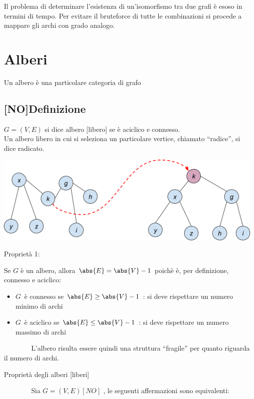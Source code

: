\documentclass{article}
\providecommand{\tightlist}{%
  \setlength{\itemsep}{0pt}\setlength{\parskip}{0pt}}
\begin{document}
{{{{}

{Il problema di determinare l'esistenza di un'isomorfismo tra due grafi è esoso in termini di tempo. Per evitare il bruteforce di tutte le combinazioni si procede a mappare gli archi con grado analogo.}

\hypertarget{h.jnoiha3cadu8}{\section{\texorpdfstring{{Alberi}}{Alberi}}\label{h.jnoiha3cadu8}}

{Un albero è una particolare categoria di grafo}

\subsection{{[}NO{]}Definizione}

$G=(V,E)$ si dice albero {[}libero{]} se è aciclico e connesso.\\
Un albero libero in cui si seleziona un particolare vertice, chiamato ``radice'', si dice radicato.

{\includegraphics{images/image533.png}}

{Proprietà 1:}

Se $G$ è un albero, allora $\abs{E} = \abs{V} - 1$ poichè è, per definizione, connesso e aciclico:

\begin{itemize}
\tightlist
\item
  $G${~è connesso se $\abs{E} \geq \abs{V} - 1$ : si deve rispettare un numero minimo di archi}
\item
  $G${~è aciclico se $\abs{E} \leq \abs{V} - 1$ : si deve rispettare un numero massimo di archi}
\end{itemize}

{~~~~~~~~L'albero risulta essere quindi una struttura ``fragile'' per
quanto riguarda il numero di archi.}

{Proprietà degli alberi {[}liberi{]}}

{~~~~~~~~Sia }$G=(V,E) [NO]$ {, le seguenti affermazioni sono equivalenti:}

}}}
\end{document}
